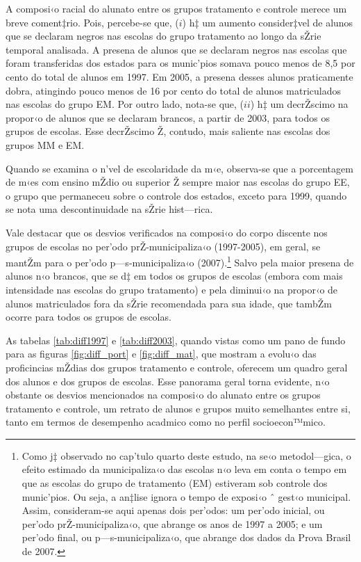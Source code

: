 \documentclass[a4paper, 12pt]{article}
\begin{document}
A composi‹o racial do alunato entre os grupos tratamento e controle merece um breve coment‡rio. Pois, percebe-se que, ($i$) h‡ um aumento consider‡vel de alunos que se declaram negros nas escolas do grupo tratamento ao longo da sŽrie temporal analisada. A presena de alunos que se declaram negros nas escolas que foram transferidas dos estados para os munic’pios somava pouco menos de 8,5 por cento do total de alunos em 1997. Em 2005, a presena desses alunos praticamente dobra, atingindo pouco menos de 16 por cento do total de alunos matriculados nas escolas do grupo EM. Por outro lado, nota-se que, ($ii$) h‡ um decrŽscimo na propor‹o de alunos que se declaram brancos, a partir de 2003, para todos os grupos de escolas. Esse decrŽscimo Ž, contudo, mais saliente nas escolas dos grupos MM e EM. 

Quando se examina o n’vel de escolaridade da m‹e, observa-se que a porcentagem de m‹es com ensino mŽdio ou superior Ž sempre maior nas escolas do grupo EE, o grupo que permaneceu sobre o controle dos estados, exceto para 1999, quando se nota uma descontinuidade na sŽrie hist—rica. 

Vale destacar que os desvios verificados na composi‹o do corpo discente nos grupos de escolas no per’odo prŽ-municipaliza‹o (1997-2005), em geral, se mantŽm para o per’odo p—s-municipaliza‹o (2007).\footnote{Como j‡ observado no cap’tulo quarto deste estudo, na se‹o metodol—gica, o efeito estimado da municipaliza‹o das escolas n‹o leva em conta o tempo em que as escolas do grupo de tratamento (EM) estiveram sob controle dos munic’pios. Ou seja, a an‡lise ignora o tempo de exposi‹o ˆ gest‹o municipal. Assim, consideram-se aqui apenas dois per’odos: um per’odo inicial, ou per’odo prŽ-municipaliza‹o, que abrange os anos de 1997 a 2005; e um per’odo final, ou p—s-municipaliza‹o, que abrange dos dados da Prova Brasil de 2007.} Salvo pela maior presena de alunos n‹o brancos, que se d‡ em todos os grupos de escolas (embora com mais intensidade nas escolas do grupo tratamento) e pela diminui‹o na propor‹o de alunos matriculados fora da sŽrie recomendada para sua idade, que tambŽm ocorre para todos os grupos de escolas. 

As tabelas \ref{tab:diff1997} e \ref{tab:diff2003}, quando vistas como um pano de fundo para as figuras \ref{fig:diff_port} e \ref{fig:diff_mat}, que mostram a evolu‹o das proficincias mŽdias dos grupos tratamento e controle, oferecem um quadro geral dos alunos e dos grupos de escolas. Esse panorama geral torna evidente, n‹o obstante os desvios mencionados na composi‹o do alunato entre os grupos tratamento e controle, um retrato de alunos e grupos muito semelhantes entre si, tanto em termos de desempenho acadmico como no perfil socioecon™mico. 
\end{document}
